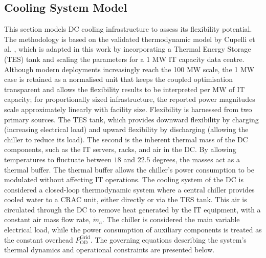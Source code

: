 \documentclass[lettersize,journal]{IEEEtran}
\newcommand{\rev}[1]{\textcolor{blue!70!black}{#1}}
\begin{document}
\subsection{Cooling System Model} \label{sec: Cooling Infrastructure Flexibility} 
This section models DC cooling infrastructure to assess its flexibility potential. The methodology is based on the validated thermodynamic model by Cupelli et al. \cite{cupelli2018data}, which is adapted in this work by incorporating a Thermal Energy Storage (TES) tank and scaling the parameters for a 1 MW IT capacity data centre. \rev{Although modern deployments increasingly reach the 100 MW scale, the 1 MW case is retained as a normalised unit that keeps the coupled optimisation transparent and allows the flexibility results to be interpreted per MW of IT capacity; for proportionally sized infrastructure, the reported power magnitudes scale approximately linearly with facility size.}
Flexibility is harnessed from two primary sources. The TES tank, which provides downward flexibility by charging (increasing electrical load) and upward flexibility by discharging (allowing the chiller to reduce its load). The second is the inherent thermal mass of the DC components, such as the IT servers, racks, and air in the DC. By allowing temperatures to fluctuate between $18$ and $22.5$ degrees, the masses act as a thermal buffer. The thermal buffer allows the chiller's power consumption to be modulated without affecting IT operations.
The cooling system of the DC is considered a closed-loop thermodynamic system where a central chiller provides cooled water to a CRAC unit, either directly or via the TES tank. This air is circulated through the DC to remove heat generated by the IT equipment, with a constant air mass flow rate, $\dot{m}_{a}$. The chiller is considered the main variable electrical load, while the power consumption of auxiliary components is treated as \rev{the constant overhead $P^{\mathrm{Grid}}_{\mathrm{OD}}$}. The governing equations describing the system's thermal dynamics and operational constraints are presented below.
\end{document}
